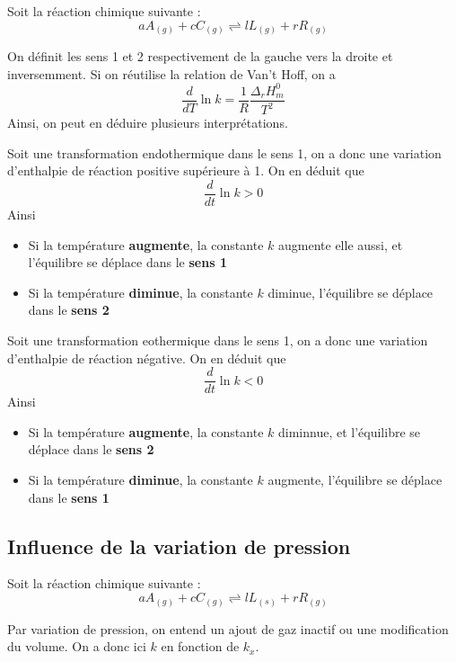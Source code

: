 Soit la réaction chimique suivante :
$$aA_{(g)}+cC_{(g)} \rightleftharpoons lL_{(g)}+rR_{(g)}$$

On définit les sens 1 et 2 respectivement de la gauche vers la droite et inversemment. Si on réutilise la relation de Van't Hoff, on a 
$$\frac{d}{dT} \ln k = \frac{1}{R} \frac{\Delta_rH_m^0}{T^2}$$
Ainsi, on peut en déduire plusieurs interprétations.\\

\begin{proposition}
Soit une transformation endothermique dans le sens 1, on a donc une variation d'enthalpie de réaction positive supérieure à 1. On en déduit que 
$$\frac{d}{dt}\ln k > 0$$
Ainsi
\begin{itemize}
\item Si la température \textbf{augmente}, la constante $k$ augmente elle aussi, et l'équilibre se déplace dans le \textbf{sens 1}
\item Si la température \textbf{diminue}, la constante $k$ diminue, l'équilibre se déplace dans le \textbf{sens 2}
\end{itemize}
\end{proposition}

\begin{proposition}
Soit une transformation eothermique dans le sens 1, on a donc une variation d'enthalpie de réaction négative. On en déduit que 
$$\frac{d}{dt}\ln k < 0$$
Ainsi
\begin{itemize}
\item Si la température \textbf{augmente}, la constante $k$ diminnue, et l'équilibre se déplace dans le \textbf{sens 2}
\item Si la température \textbf{diminue}, la constante $k$ augmente, l'équilibre se déplace dans le \textbf{sens 1}
\end{itemize}
\end{proposition}

\subsection{Influence de la variation de pression}

Soit la réaction chimique suivante :
$$aA_{(g)}+cC_{(g)} \rightleftharpoons lL_{(s)}+rR_{(g)}$$

Par variation de pression, on entend un ajout de gaz inactif ou une modification du volume. On a donc ici $k$ en fonction de $k_x$. 


